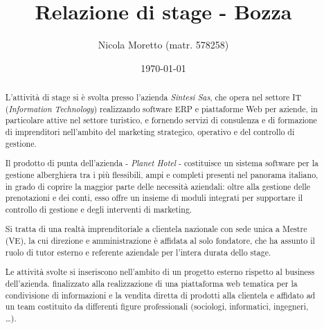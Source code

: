 \documentclass[11pt,a4paper,headsepline,hidelinks]{scrreprt} %
\begin{document}
  \title{Relazione di stage - Bozza}
	\subject{Analisi e progettazione di un'interfaccia grafica per la consultazione dei contenuti informativi in una piattaforma web tematica}
  \author{Nicola Moretto (matr. 578258)}
  \date{\today}

  \maketitle

	\tableofcontents

	\listoffigures
	\begingroup
	\let\clearpage\relax
	\listoftables
	\endgroup
	
	\begin{abstract}
	L'attività di stage si è svolta presso l'azienda \textit{Sintesi Sas}, che opera nel settore IT (\textit{Information Technology}) realizzando software ERP e piattaforme Web per aziende, in particolare attive nel settore turistico, e fornendo servizi di consulenza e di formazione di imprenditori nell'ambito del marketing strategico, operativo e del controllo di gestione.
	
	Il prodotto di punta dell'azienda - \textit{Planet Hotel} - costituisce un sistema software per la gestione alberghiera tra i più flessibili, ampi e completi presenti nel panorama italiano, in grado di coprire la maggior parte delle necessità aziendali: oltre alla gestione delle prenotazioni e dei conti, esso offre un insieme di moduli integrati per supportare il controllo di gestione e degli interventi di marketing.

	Si tratta di una realtà imprenditoriale a clientela nazionale con sede unica a Mestre (VE), la cui direzione e amministrazione è affidata al solo fondatore, che ha assunto il ruolo di tutor esterno e referente aziendale per l'intera durata dello stage.

	Le attività svolte si inseriscono nell'ambito di un progetto esterno rispetto al business dell'azienda. finalizzato alla realizzazione di una piattaforma web tematica per la condivisione di informazioni e la vendita diretta di prodotti alla clientela e affidato ad un team costituito da differenti figure professionali (sociologi, informatici, ingegneri, \ldots).
	\end{abstract}

	
	
	
	

	\appendix
	
	
	
\end{document}
